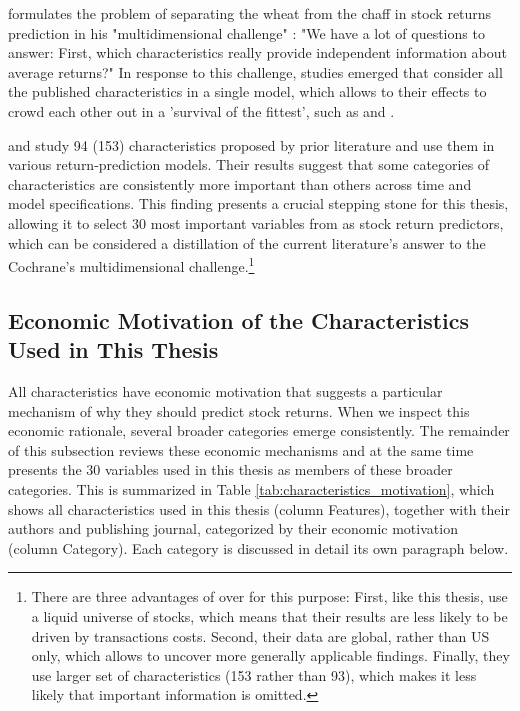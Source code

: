 			\citeauthor{cochrane2011presidential} formulates the problem of separating the wheat from the chaff in stock returns prediction in his "multidimensional challenge" \citep[p.~1060]{cochrane2011presidential}: "We have a lot of questions to answer: First, which characteristics really provide independent information about average returns?" In response to this challenge, studies emerged that consider all the published characteristics in a single model, which allows to their effects to crowd each other out in a 'survival of the fittest', such as \cite{gu2020empirical} and \cite{tobek2020does}. 
			
			\cite{gu2020empirical} and \cite{tobek2020does} study 94 (153) characteristics proposed by prior literature and use them in various return-prediction models. Their results suggest that some categories of characteristics are consistently more important than others across time and model specifications. This finding presents a crucial stepping stone for this thesis, allowing it to select 30 most important variables from \cite{tobek2020does} as stock return predictors, which can be considered a distillation of the current literature's answer to the Cochrane's multidimensional challenge.\footnote{There are three advantages of \cite{tobek2020does} over \cite{gu2020empirical} for this purpose: First, like this thesis,  \cite{tobek2020does} use a liquid universe of stocks, which means that their results are less likely to be driven by transactions costs. Second, their data are global, rather than US only, which allows to uncover more generally applicable findings. Finally, they use larger set of characteristics (153 rather than 93), which makes it less likely that important information is omitted.} 
			
		\subsection{Economic Motivation of the Characteristics Used in This Thesis}
			
			All characteristics have economic motivation that suggests a particular mechanism of why they should predict stock returns. When we inspect this economic rationale, several broader categories emerge consistently. The remainder of this subsection reviews these economic mechanisms and at the same time presents the 30 variables used in this thesis as members of these broader categories. This is summarized in Table \ref{tab:characteristics_motivation}, which shows all characteristics used in this thesis (column Features), together with their authors and publishing journal, categorized by their economic motivation (column Category). Each category is discussed in detail its own paragraph below. 
			
